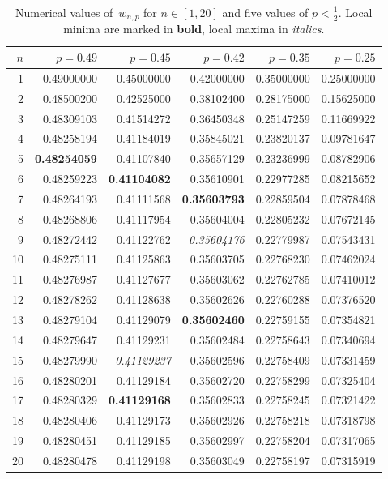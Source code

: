 \documentclass[reqno,final,11pt]{amsart}
\theoremstyle{plain}
\theoremstyle{definition}
\theoremstyle{remark}
\begin{document}
\begin{table}[h]
\centering
\small
\begin{tabular}{r *{5}{r}}
\toprule
$n$ & $p=0.49$ & $p=0.45$ & $p=0.42$ & $p=0.35$ & $p=0.25$ \\
\midrule
 1 & 0.49000000 & 0.45000000 & 0.42000000 & 0.35000000 & 0.25000000 \\
 2 & 0.48500200 & 0.42525000 & 0.38102400 & 0.28175000 & 0.15625000 \\
 3 & 0.48309103 & 0.41514272 & 0.36450348 & 0.25147259 & 0.11669922 \\
 4 & 0.48258194 & 0.41184019 & 0.35845021 & 0.23820137 & 0.09781647 \\
 5 & \textbf{0.48254059} & 0.41107840 & 0.35657129 & 0.23236999 & 0.08782906 \\
 6 & 0.48259223 & \textbf{0.41104082} & 0.35610901 & 0.22977285 & 0.08215652 \\
 7 & 0.48264193 & 0.41111568 & \textbf{0.35603793} & 0.22859504 & 0.07878468 \\
 8 & 0.48268806 & 0.41117954 & 0.35604004 & 0.22805232 & 0.07672145 \\
 9 & 0.48272442 & 0.41122762 & \textit{0.35604176} & 0.22779987 & 0.07543431 \\
10 & 0.48275111 & 0.41125863 & 0.35603705 & 0.22768230 & 0.07462024 \\
11 & 0.48276987 & 0.41127677 & 0.35603062 & 0.22762785 & 0.07410012 \\
12 & 0.48278262 & 0.41128638 & 0.35602626 & 0.22760288 & 0.07376520 \\
13 & 0.48279104 & 0.41129079 & \textbf{0.35602460} & 0.22759155 & 0.07354821 \\
14 & 0.48279647 & 0.41129231 & 0.35602484 & 0.22758643 & 0.07340694 \\
15 & 0.48279990 & \textit{0.41129237} & 0.35602596 & 0.22758409 & 0.07331459 \\
16 & 0.48280201 & 0.41129184 & 0.35602720 & 0.22758299 & 0.07325404 \\
17 & 0.48280329 & \textbf{0.41129168} & 0.35602833 & 0.22758245 & 0.07321422 \\
18 & 0.48280406 & 0.41129173 & 0.35602926 & 0.22758218 & 0.07318798 \\
19 & 0.48280451 & 0.41129185 & 0.35602997 & 0.22758204 & 0.07317065 \\
20 & 0.48280478 & 0.41129198 & 0.35603049 & 0.22758197 & 0.07315919 \\
\bottomrule
\end{tabular}
\caption{Numerical values of~$w_{n,p}$ for $n\in[1,20]$ and five
  values of $p<\tfrac12$.  Local minima are marked in
  \textbf{bold}, local maxima in \textit{italics}.}\label{tab:w-values}
\end{table}
\end{document}
